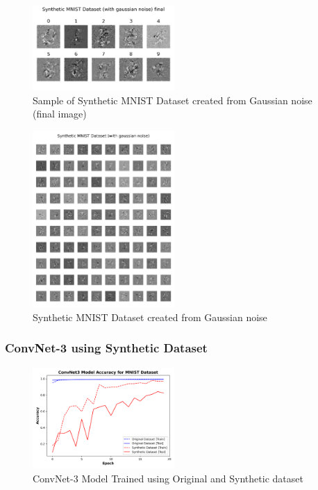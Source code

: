 \documentclass[conference, compsoc]{IEEEtran}
\begin{document}
\begin{figure}[H]
	\centering
	\includegraphics[width=0.48\textwidth]{mnist_noise_syn.png}
	\caption{Sample of Synthetic MNIST Dataset created from Gaussian noise (final image)}
	\label{fig:mnist_noise_syn}
\end{figure}

\begin{figure}[H]
	\centering
	\includegraphics[width=0.48\textwidth]{mnist_noise_syn_all.png}
	\caption{Synthetic MNIST Dataset created from Gaussian noise}
	\label{fig:mnist_noise_syn_all}
\end{figure}
\subsubsection{ConvNet-3 using Synthetic Dataset}
\begin{figure}[H]
	\centering
	\includegraphics[width=0.48\textwidth]{mnist_syn_acc.png}
	\caption{ConvNet-3 Model Trained using Original and Synthetic dataset}
	\label{fig:mnist_syn_acc}
\end{figure}
\end{document}

